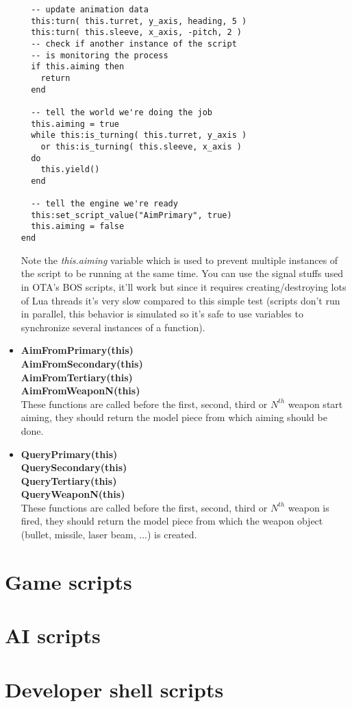 \documentclass[a4paper,10pt]{article}
\begin{document}
\begin{itemize}
\begin{lstlisting}
  -- update animation data
  this:turn( this.turret, y_axis, heading, 5 )
  this:turn( this.sleeve, x_axis, -pitch, 2 )
  -- check if another instance of the script
  -- is monitoring the process
  if this.aiming then
    return
  end

  -- tell the world we're doing the job
  this.aiming = true
  while this:is_turning( this.turret, y_axis )
	or this:is_turning( this.sleeve, x_axis )
  do
    this.yield()
  end

  -- tell the engine we're ready
  this:set_script_value("AimPrimary", true)
  this.aiming = false
end
\end{lstlisting}
  Note the \emph{this.aiming} variable which is used to prevent multiple instances of the script to be running at the same time. You can use the signal stuffs used in OTA's BOS scripts, it'll work but since it requires creating/destroying lots of Lua threads it's very slow compared to this simple test (scripts don't run in parallel, this behavior is simulated so it's safe to use variables to synchronize several instances of a function).

 \item \textbf{AimFromPrimary(this)}\\
       \textbf{AimFromSecondary(this)}\\
       \textbf{AimFromTertiary(this)}\\
       \textbf{AimFromWeaponN(this)}\\
  These functions are called before the first, second, third or $N^{th}$ weapon start aiming, they should return the model piece from which aiming should be done.

 \item \textbf{QueryPrimary(this)}\\
       \textbf{QuerySecondary(this)}\\
       \textbf{QueryTertiary(this)}\\
       \textbf{QueryWeaponN(this)}\\
  These functions are called before the first, second, third or $N^{th}$ weapon is fired, they should return the model piece from which the weapon object (bullet, missile, laser beam, ...) is created.

\end{itemize}


\section{Game scripts}

\section{AI scripts}

\section{Developer shell scripts}
\end{document}
